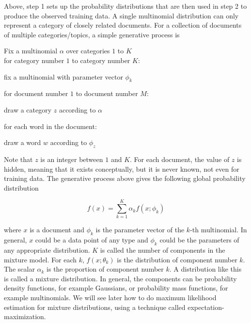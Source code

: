 \documentclass[12pt]{report}
\begin{document}
\vspace{3mm}

Above, step 1 sets up the probability distributions that are then used in step 2 to produce the observed training data. A single multinomial distribution can only represent a category of closely related documents. For a collection of documents of multiple categories/topics, a simple
generative process is

\vspace{3mm}

\begin{enumerate}
\item Fix a multinomial $\alpha$ over categories $1$ to $K$\\
for category number $1$ to category number $K$:
\begin{description}
\item   fix a multinomial with parameter vector $\phi_k$
\end{description}

\item for document number $1$ to document number $M$:
\begin{description}
\item draw a category $z$ according to $\alpha$
\item for each word in the document:
  	\begin{description}
  	\item	draw a word $w$ according to $\phi_z$
  	\end{description}
\end{description}
\end{enumerate}
\vspace{3mm}

Note that $z$ is an integer between $1$ and $K$. For each document, the value of $z$ is hidden, meaning that it exists conceptually, but it is never known, not even for training data. The generative process above gives the following global probability distribution\par
\vspace{3mm}

\begin{equation}
f(x) = \sum\limits_{k=1}^K \alpha_k f(x;\phi_k)
\end{equation}

\vspace{3mm}

where $x$ is a document and $\phi_k$ is the parameter vector of the $k$-th multinomial. In general, $x$ could be a data point of any type and $\phi_k$ could be the parameters of any appropriate distribution. $K$ is called the number of components in the mixture model. For each $k$, $f (x; \theta_k)$ is the distribution of component number $k$. The scalar $\alpha_k$ is the proportion of component number $k$. A distribution like this is called a mixture distribution. In general, the components can be probability density functions, for example Gaussians, or probability mass functions, for example multinomials. We will see later how to do maximum likelihood estimation for mixture distributions, using a technique called expectation-maximization.\par
\end{document}
